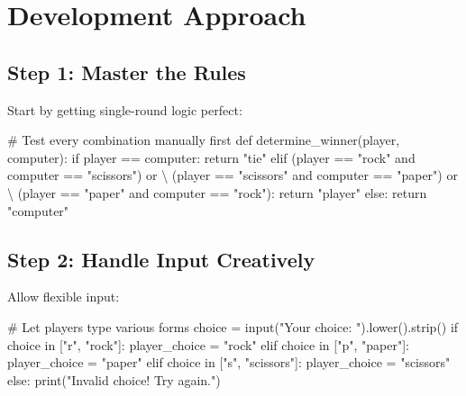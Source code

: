\documentclass[
  letterpaper,
  DIV=11,
  numbers=noendperiod,
  oneside]{scrreprt}
\newenvironment{Shaded}{}{}
\newcommand{\BuiltInTok}[1]{\textcolor[rgb]{0.84,0.23,0.29}{#1}}
\newcommand{\CommentTok}[1]{\textcolor[rgb]{0.42,0.45,0.49}{#1}}
\newcommand{\ControlFlowTok}[1]{\textcolor[rgb]{0.84,0.23,0.29}{#1}}
\newcommand{\KeywordTok}[1]{\textcolor[rgb]{0.84,0.23,0.29}{#1}}
\newcommand{\NormalTok}[1]{\textcolor[rgb]{0.14,0.16,0.18}{#1}}
\newcommand{\OperatorTok}[1]{\textcolor[rgb]{0.14,0.16,0.18}{#1}}
\newcommand{\StringTok}[1]{\textcolor[rgb]{0.01,0.18,0.38}{#1}}
\begin{document}
\section{Development Approach}\label{development-approach-3}

\subsection{Step 1: Master the Rules}\label{step-1-master-the-rules}

Start by getting single-round logic perfect:

\begin{Shaded}
\begin{Highlighting}[]
\CommentTok{\# Test every combination manually first}
\KeywordTok{def}\NormalTok{ determine\_winner(player, computer):}
    \ControlFlowTok{if}\NormalTok{ player }\OperatorTok{==}\NormalTok{ computer:}
        \ControlFlowTok{return} \StringTok{"tie"}
    \ControlFlowTok{elif}\NormalTok{ (player }\OperatorTok{==} \StringTok{"rock"} \KeywordTok{and}\NormalTok{ computer }\OperatorTok{==} \StringTok{"scissors"}\NormalTok{) }\KeywordTok{or} \OperatorTok{\textbackslash{}}
\NormalTok{         (player }\OperatorTok{==} \StringTok{"scissors"} \KeywordTok{and}\NormalTok{ computer }\OperatorTok{==} \StringTok{"paper"}\NormalTok{) }\KeywordTok{or} \OperatorTok{\textbackslash{}}
\NormalTok{         (player }\OperatorTok{==} \StringTok{"paper"} \KeywordTok{and}\NormalTok{ computer }\OperatorTok{==} \StringTok{"rock"}\NormalTok{):}
        \ControlFlowTok{return} \StringTok{"player"}
    \ControlFlowTok{else}\NormalTok{:}
        \ControlFlowTok{return} \StringTok{"computer"}
\end{Highlighting}
\end{Shaded}

\subsection{Step 2: Handle Input
Creatively}\label{step-2-handle-input-creatively}

Allow flexible input:

\begin{Shaded}
\begin{Highlighting}[]
\CommentTok{\# Let players type various forms}
\NormalTok{choice }\OperatorTok{=} \BuiltInTok{input}\NormalTok{(}\StringTok{"Your choice: "}\NormalTok{).lower().strip()}
\ControlFlowTok{if}\NormalTok{ choice }\KeywordTok{in}\NormalTok{ [}\StringTok{"r"}\NormalTok{, }\StringTok{"rock"}\NormalTok{]:}
\NormalTok{    player\_choice }\OperatorTok{=} \StringTok{"rock"}
\ControlFlowTok{elif}\NormalTok{ choice }\KeywordTok{in}\NormalTok{ [}\StringTok{"p"}\NormalTok{, }\StringTok{"paper"}\NormalTok{]:}
\NormalTok{    player\_choice }\OperatorTok{=} \StringTok{"paper"}
\ControlFlowTok{elif}\NormalTok{ choice }\KeywordTok{in}\NormalTok{ [}\StringTok{"s"}\NormalTok{, }\StringTok{"scissors"}\NormalTok{]:}
\NormalTok{    player\_choice }\OperatorTok{=} \StringTok{"scissors"}
\ControlFlowTok{else}\NormalTok{:}
    \BuiltInTok{print}\NormalTok{(}\StringTok{"Invalid choice! Try again."}\NormalTok{)}
\end{Highlighting}
\end{Shaded}
\end{document}
